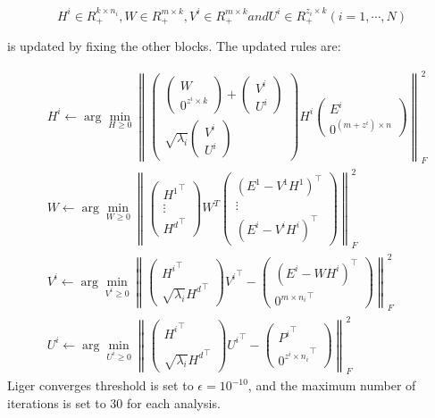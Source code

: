 \begin{equation} 
	H^i \in R_+^{k\times n_i}, W \in R_+^{m\times k}, V^i \in R_+^{m\times k} and  U^i \in R_+^{z_i\times k}(i = 1,\cdots, N)
\end{equation}

is updated by fixing the other blocks. The updated rules are:

\begin{equation}
	\begin{aligned}
	&H^i \leftarrow \arg\min_{H\geq 0} \left\| \begin{pmatrix} \begin{pmatrix} W \\ 0^{z^i \times k}\end{pmatrix} +  \begin{pmatrix} V^i \\ U^i\end{pmatrix}  \\ \sqrt{\lambda_i}\begin{pmatrix} V^i \\ U^i\end{pmatrix}\end{pmatrix} H^i \begin{pmatrix}E^i \\ 0^{(m+z^i)\times n}\end{pmatrix} \right\|_{F}^2  \\
	&W \leftarrow \arg \min_{W\geq 0} \left\| \begin{pmatrix} {H^1}^\top \\ \vdots \\ {H^d}^\top \end{pmatrix} W^T  \begin{pmatrix} {(E^1 - V^1 H^1)}^\top \\ \vdots \\{(E^i - V^i H^i)}^\top  \end{pmatrix} \right\|_{F}^2 \\
	&V^i \leftarrow \arg \min_{V^i\geq 0} \left\| \begin{pmatrix} {H^i}^\top \\ \sqrt{\lambda_i}{H^d}^\top \end{pmatrix} {V^i}^\top - \begin{pmatrix} {(E^i - W H^i)}^\top \\ {0^{m\times n_i}}^\top  \end{pmatrix} \right\|_{F}^2 \\
	&U^i \leftarrow \arg \min_{U^i\geq 0} \left\| \begin{pmatrix} {H^i}^\top \\  \\ \sqrt{\lambda_i}{H^d}^\top \end{pmatrix} {U^i}^\top - \begin{pmatrix} {P^i}^\top \\ {0^{z^i\times n_i}}^\top  \end{pmatrix} \right\|_{F}^2
	\end{aligned}
\end{equation}
Liger converges threshold is set to $\epsilon = 10^{-10}$, and the maximum number of iterations is set to 30 for each analysis.

